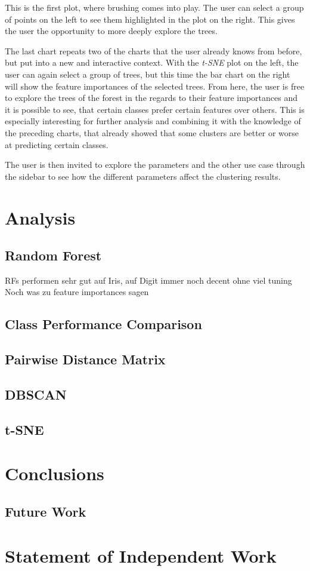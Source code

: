 \documentclass[a4paper, 12pt]{article}
\begin{document}
This is the first plot, where brushing comes into play. The user can select a group of points on the
left to see them highlighted in the plot on the right. This gives the user the opportunity to more
deeply explore the trees. \par
The last chart repeats two of the charts that the user already knows from before, but put into a new
and interactive context. With the \textit{t-SNE} plot on the left, the user can again select a group
of trees, but this time the bar chart on the right will show the feature importances of the selected
trees. From here, the user is free to explore the trees of the forest in the regards to their
feature importances and it is possible to see, that certain classes prefer certain features over
others. This is especially interesting for further analysis and combining it with the knowledge of
the preceding charts, that already showed that some clusters are better or worse at predicting certain
classes. \par
The user is then invited to explore the parameters and the other use case through the sidebar to see
how the different parameters affect the clustering results.

\section{Analysis}
\subsection{Random Forest}
RFs performen sehr gut auf Iris, auf Digit immer noch decent ohne viel tuning
Noch was zu feature importances sagen

\subsection{Class Performance Comparison}

\subsection{Pairwise Distance Matrix}

\subsection{DBSCAN}

\subsection{t-SNE}

\section{Conclusions}

\subsection{Future Work}

\section{Statement of Independent Work}

\clearpage


\end{document}
